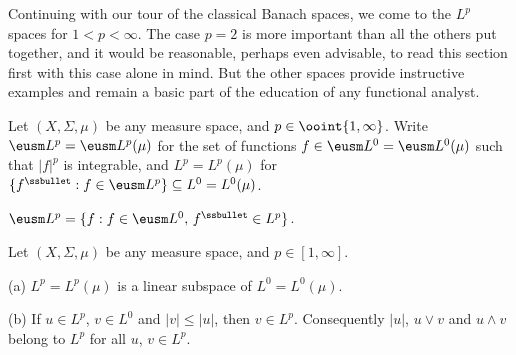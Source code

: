 
\def\chaptername{Function spaces}
\def\sectionname{$L^{p}$}


Continuing with our tour of the classical Banach spaces, we come to
the $L^p$ spaces for $1<p<\infty$.   The case $p=2$ is more important
than all the others put together, and it would be reasonable, perhaps
even advisable, to read this section first with this case alone in mind.
But the other spaces provide instructive examples and remain a basic
part of the education of any functional analyst.

Let $(X,\Sigma,\mu)$ be any measure space, and $p\in\ooint{1,\infty}$.
Write $\eusm L^p=\eusm L^p(\mu)$ for the set of functions
$f\in\eusm L^0=\eusm L^0(\mu)$ such that $|f|^p$ is integrable,
and $L^p=L^p(\mu)$ for
$\{f^{\ssbullet}:f\in\eusm L^p\}\subseteq L^0=L^0(\mu)$.

 $\eusm L^p=\{f:f\in\eusm L^0,\,f^{\ssbullet}\in L^p\}$.


 Let $(X,\Sigma,\mu)$ be any measure space, and
$p\in[1,\infty]$.

(a) $L^p=L^p(\mu)$ is a linear subspace of $L^0=L^0(\mu)$.

(b) If $u\in L^p$, $v\in L^0$ and $|v|\le |u|$, then $v\in L^p$.
Consequently $|u|$, $u\vee v$ and $u\wedge v$ belong to $L^p$ for all
$u$, $v\in L^p$.

